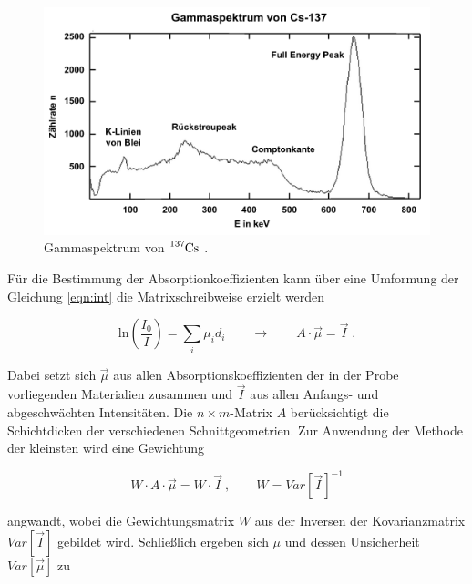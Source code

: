 \vspace{-5pt}
\begin{figure}
    \centering
    \includegraphics[scale=0.6]{content/spektrum.png}
    \vspace{-10pt}
    \caption{Gammaspektrum von $\ce{^{137}Cs}$ \cite{leifi}.}
    \label{fig:spektrum}
\end{figure}
\vspace{-5pt}

Für die Bestimmung der Absorptionkoeffizienten kann über eine Umformung der Gleichung \eqref{eqn:int}
die Matrixschreibweise erzielt werden

\begin{equation}
    \text{ln} \left(\frac{I_0}{I}\right) = \sum_i \mu_i d_i \qquad \to \qquad A \cdot \vec{\mu} = \vec{I} \; .
\end{equation}

Dabei setzt sich $\vec{\mu}$ aus allen Absorptionskoeffizienten der in der Probe vorliegenden Materialien zusammen
und $\vec{I}$ aus allen Anfangs- und abgeschwächten Intensitäten. Die $n \times m$-Matrix $A$ berücksichtigt die Schichtdicken
der verschiedenen Schnittgeometrien. 
Zur Anwendung der Methode der kleinsten wird eine Gewichtung 

\vspace{-5pt}
\begin{equation}
    W \cdot A \cdot \vec{\mu} = W \cdot \vec{I} \:, \qquad W = Var[\vec{I}]^{-1}
\end{equation}
\vspace{-5pt}

angwandt, wobei die Gewichtungsmatrix $W$ aus der Inversen der Kovarianzmatrix $Var[\vec{I}]$ gebildet wird.
Schließlich ergeben sich $\mu$ und dessen Unsicherheit $Var[\vec{\mu}]$ zu

